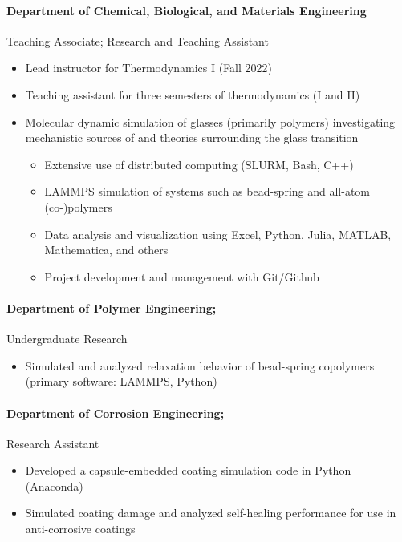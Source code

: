 \documentclass{my_cv}
\begin{document}
\paragraph{Department of Chemical, Biological, and Materials Engineering\\}
Teaching Associate; Research and Teaching Assistant
\begin{itemize}
    \item Lead instructor for Thermodynamics I (Fall 2022)
    \item Teaching assistant for three semesters of thermodynamics (I and II)
    \item Molecular dynamic simulation of glasses (primarily polymers) investigating mechanistic sources of and theories surrounding the glass transition
    \begin{itemize}
        \item Extensive use of distributed computing (SLURM, Bash, C++)
        \item LAMMPS simulation of systems such as bead-spring and all-atom (co-)polymers
        \item Data analysis and visualization using Excel, Python, Julia, MATLAB, Mathematica, and others
        \item Project development and management with Git/Github
    \end{itemize}
\end{itemize}

\paragraph{Department of Polymer Engineering;}
Undergraduate Research
\begin{itemize}
    \item Simulated and analyzed relaxation behavior of bead-spring co\-polymers (primary software: LAMMPS, Python)
\end{itemize}

\paragraph{Department of Corrosion Engineering;}
Research Assistant
\begin{itemize}
    \item Developed a capsule-embedded coating simulation code in Python (Anaconda)
    \item Simulated coating damage and analyzed self-healing performance for use in anti-corrosive coatings
\end{itemize}
\end{document}
